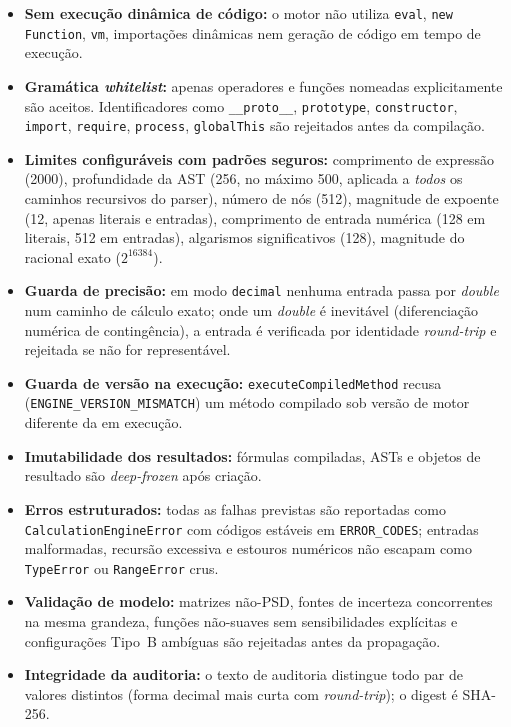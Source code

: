 \documentclass[11pt,a4paper]{article}
\begin{document}
\begin{itemize}
  \item \textbf{Sem execução dinâmica de código:} o motor não utiliza \texttt{eval}, \texttt{new Function}, \texttt{vm}, importações dinâmicas nem geração de código em tempo de execução.
  \item \textbf{Gramática \emph{whitelist}:} apenas operadores e funções nomeadas explicitamente são aceitos. Identificadores como \texttt{\_\_proto\_\_}, \texttt{prototype}, \texttt{constructor}, \texttt{import}, \texttt{require}, \texttt{process}, \texttt{globalThis} são rejeitados antes da compilação.
  \item \textbf{Limites configuráveis com padrões seguros:} comprimento de expressão (2000), profundidade da AST (256, no máximo 500, aplicada a \emph{todos} os caminhos recursivos do parser), número de nós (512), magnitude de expoente (12, apenas literais e entradas), comprimento de entrada numérica (128 em literais, 512 em entradas), algarismos significativos (128), magnitude do racional exato (\(2^{16384}\)).
  \item \textbf{Guarda de precisão:} em modo \texttt{decimal} nenhuma entrada passa por \emph{double} num caminho de cálculo exato; onde um \emph{double} é inevitável (diferenciação numérica de contingência), a entrada é verificada por identidade \emph{round-trip} e rejeitada se não for representável.
  \item \textbf{Guarda de versão na execução:} \texttt{executeCompiledMethod} recusa (\texttt{ENGINE\_VERSION\_MISMATCH}) um método compilado sob versão de motor diferente da em execução.
  \item \textbf{Imutabilidade dos resultados:} fórmulas compiladas, ASTs e objetos de resultado são \emph{deep-frozen} após criação.
  \item \textbf{Erros estruturados:} todas as falhas previstas são reportadas como \texttt{CalculationEngineError} com códigos estáveis em \texttt{ERROR\_CODES}; entradas malformadas, recursão excessiva e estouros numéricos não escapam como \texttt{TypeError} ou \texttt{RangeError} crus.
  \item \textbf{Validação de modelo:} matrizes não-PSD, fontes de incerteza concorrentes na mesma grandeza, funções não-suaves sem sensibilidades explícitas e configurações Tipo~B ambíguas são rejeitadas antes da propagação.
  \item \textbf{Integridade da auditoria:} o texto de auditoria distingue todo par de valores distintos (forma decimal mais curta com \emph{round-trip}); o digest é SHA-256.
\end{itemize}
\end{document}
